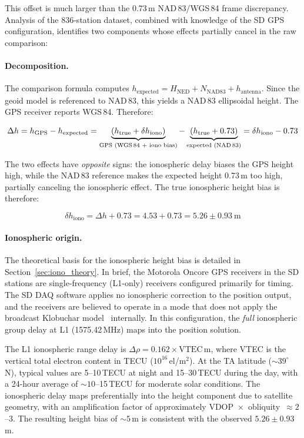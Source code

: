 \documentclass[11pt,letterpaper]{article}
\newcommand{\degree}{^\circ}
\begin{document}
This offset is much larger than the 0.73\,m NAD\,83/WGS\,84 frame discrepancy. Analysis of the 836-station dataset, combined with knowledge of the SD GPS configuration, identifies two components whose effects partially cancel in the raw comparison:

\paragraph{Decomposition.} The comparison formula computes $h_{\text{expected}} = H_{\text{NED}} + N_{\text{NAD83}} + h_{\text{antenna}}$. Since the geoid model is referenced to NAD\,83, this yields a NAD\,83 ellipsoidal height. The GPS receiver reports WGS\,84. Therefore:

\begin{equation}
\Delta h = h_{\text{GPS}} - h_{\text{expected}} = \underbrace{(h_{\text{true}} + \delta h_{\text{iono}})}_{\text{GPS (WGS\,84 + iono bias)}} - \underbrace{(h_{\text{true}} + 0.73)}_{\text{expected (NAD\,83)}} = \delta h_{\text{iono}} - 0.73
\label{eq:sd_decomp}
\end{equation}

\noindent The two effects have \emph{opposite} signs: the ionospheric delay biases the GPS height high, while the NAD\,83 reference makes the expected height 0.73\,m too high, partially canceling the ionospheric effect. The true ionospheric height bias is therefore:

\begin{equation}
\delta h_{\text{iono}} = \Delta h + 0.73 = 4.53 + 0.73 = 5.26 \pm 0.93~\text{m}
\label{eq:iono_bias}
\end{equation}

\paragraph{Ionospheric origin.} The theoretical basis for the ionospheric height bias is detailed in Section~\ref{sec:iono_theory}. In brief, the Motorola Oncore GPS receivers in the SD stations are single-frequency (L1-only) receivers configured primarily for timing. The SD DAQ software applies no ionospheric correction to the position output, and the receivers are believed to operate in a mode that does not apply the broadcast Klobuchar model~\cite{klobuchar1987} internally. In this configuration, the \emph{full} ionospheric group delay at L1 (1575.42\,MHz) maps into the position solution.

The L1 ionospheric range delay is $\Delta\rho = 0.162 \times \text{VTEC}$\,m, where VTEC is the vertical total electron content in TECU ($10^{16}$\,el/m$^2$). At the TA latitude ($\sim\!39\degree$\,N), typical values are 5--10\,TECU at night and 15--30\,TECU during the day, with a 24-hour average of $\sim\!10$--15\,TECU for moderate solar conditions. The ionospheric delay maps preferentially into the height component due to satellite geometry, with an amplification factor of approximately VDOP~$\times$~obliquity~$\approx 2$--3. The resulting height bias of $\sim\!5$\,m is consistent with the observed $5.26 \pm 0.93$\,m.
\end{document}

